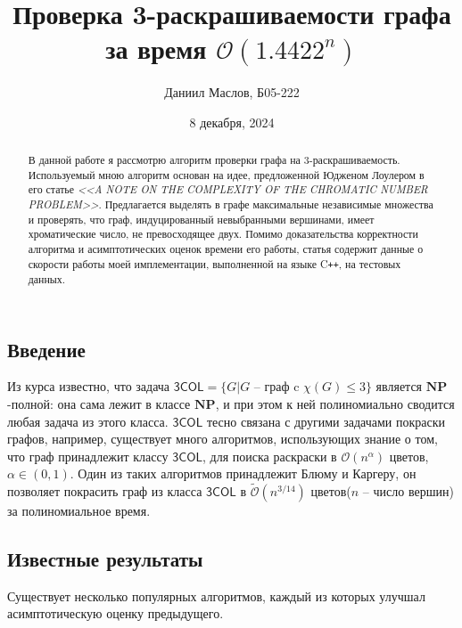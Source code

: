 \documentclass{article}
\title{Проверка 3-раскрашиваемости графа за время $\mathcal{O}(1.4422^n)$}
\author{Даниил Маслов, Б05-222}
\date{8 декабря, 2024}
\begin{document}
\maketitle

\begin{abstract}
В данной работе я рассмотрю алгоритм проверки графа на 3-раскрашиваемость.
Используемый мною алгоритм основан на идее, предложенной Юдженом Лоулером в его статье
{\it <<A NOTE ON THE COMPLEXITY OF THE CHROMATIC NUMBER PROBLEM>>}\cite{1}. Предлагается выделять в графе максимальные независимые множества
и проверять, что граф, индуцированный невыбранными вершинами, имеет хроматические число, не превосходящее двух.
Помимо доказательства корректности алгоритма и асимптотических оценок времени его работы, статья содержит данные о скорости работы моей имплементации,
выполненной на языке C\texttt{++}, на тестовых данных.
\end{abstract}

\setcounter{section}{1}
\setcounter{subsection}{0}

\subsection{Введение}

\tab Из курса известно, что задача $\mathsf{3COL} = \{G|G\text{ -- граф c }\chi(G)\leq 3\}$ является $\mathbf{NP}$-полной: она сама лежит в классе
$\mathbf{NP}$, и при этом к ней полиномиально сводится любая задача из этого класса. $\mathsf{3COL}$ тесно связана с другими задачами покраски графов,
например, существует много алгоритмов, использующих знание о том, что граф принадлежит классу $\mathsf{3COL}$, для поиска раскраски в $\mathcal{O}(n^{\alpha})$
цветов, $\alpha\in(0, 1)$. Один из таких алгоритмов принадлежит Блюму и Каргеру\cite{5}, он позволяет покрасить граф из класса $\mathsf{3COL}$ в
$\mathcal{\widetilde{O}}(n^{3/14})$ цветов($n$ -- число вершин) за полиномиальное время.

\subsection{Известные результаты}

\tab Существует несколько популярных алгоритмов, каждый из которых улучшал асимптотическую оценку предыдущего.
\end{document}

